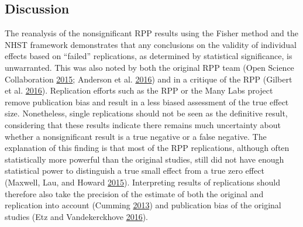\documentclass[a5paper]{book}
\begin{document}
\subsection{Discussion}\label{discussion-3}

The reanalysis of the nonsignificant RPP results using the Fisher method
and the NHST framework demonstrates that any conclusions on the validity
of individual effects based on \enquote{failed} replications, as
determined by statistical significance, is unwarranted. This was also
noted by both the original RPP team (Open Science Collaboration
\protect\hyperlink{ref-doi:10.1126ux2fscience.aac4716}{2015}; Anderson
et al. \protect\hyperlink{ref-doi:10.1126ux2fscience.aad9163}{2016}) and
in a critique of the RPP (Gilbert et al.
\protect\hyperlink{ref-doi:10.1126ux2fscience.aad7243}{2016}).
Replication efforts such as the RPP or the Many Labs project remove
publication bias and result in a less biased assessment of the true
effect size. Nonetheless, single replications should not be seen as the
definitive result, considering that these results indicate there remains
much uncertainty about whether a nonsignificant result is a true
negative or a false negative. The explanation of this finding is that
most of the RPP replications, although often statistically more powerful
than the original studies, still did not have enough statistical power
to distinguish a true small effect from a true zero effect (Maxwell,
Lau, and Howard \protect\hyperlink{ref-doi:10.1037ux2fa0039400}{2015}).
Interpreting results of replications should therefore also take the
precision of the estimate of both the original and replication into
account (Cumming
\protect\hyperlink{ref-doi:10.1177ux2f0956797613504966}{2013}) and
publication bias of the original studies (Etz and Vandekerckhove
\protect\hyperlink{ref-doi:10.1371ux2fjournal.pone.0149794}{2016}).
\end{document}
